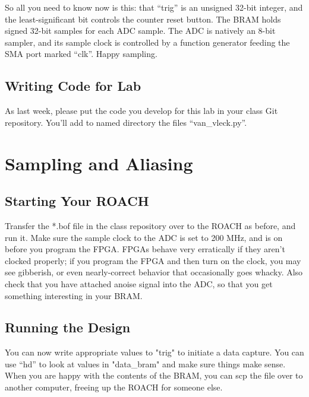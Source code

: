 \documentclass[11pt]{article}
\begin{document}
So all you need to know now is this: that ``trig'' is an unsigned 32-bit integer, and the least-significant bit
controls the counter reset button.  The BRAM holds signed 32-bit samples for each ADC sample.  The
ADC is natively an 8-bit sampler, and its sample clock is controlled by a function generator feeding the
SMA port marked ``clk''.  Happy sampling.

\subsection*{Writing Code for Lab}

As last week, please put the code you develop for this lab
in your class Git repository.  You'll add to named directory the files ``van\_vleck.py''.

\section{Sampling and Aliasing}

\subsection{Starting Your ROACH}

Transfer the *.bof file in the class repository over to the ROACH as before,
and run it.  Make sure the sample clock to the ADC is set to 200 MHz, and is
on before you program the FPGA.  FPGAs behave very erratically if they aren't
clocked properly; if you program the FPGA and then turn on the clock, you may
see gibberish, or even nearly-correct behavior that occasionally goes whacky.
Also check that you have attached anoise signal into the ADC, so that you get
something interesting in your BRAM.  

\subsection{Running the Design}

You can now write appropriate values to "trig" to initiate a data capture.  You
can use ``hd'' to look at values in "data\_bram" and make sure things make sense.
When you are happy with the contents of the BRAM, you can scp the file over to
another computer, freeing up the ROACH for someone else.
\end{document}
